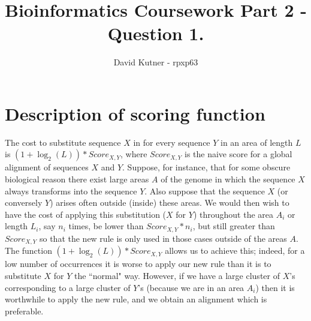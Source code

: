 \documentclass[english, 11pt]{article}
\title{Bioinformatics Coursework Part 2 - Question 1.}
\author{David Kutner - rpxp63}
\begin{document}
\maketitle

\section*{Description of scoring function}
The cost to substitute sequence $X$ in for every sequence $Y$ in an area of length $L$ is $(1+\log_2(L))*Score_{X,Y}$, where $Score_{X,Y}$ is the naive score for a global alignment of sequences $X$ and $Y$.
Suppose, for instance, that for some obscure biological reason there exist large areas $A$ of the genome in which the sequence $X$ always transforms into the sequence $Y$. Also suppose that the sequence $X$ (or conversely $Y$) arises often outside (inside) these areas. We would then wish to have the cost of applying this substitution ($X$ for $Y$) throughout the area $A_i$ or length $L_i$, say $n_i$ times, be lower than $Score_{X,Y}*n_i$, but still greater than $Score_{X,Y}$ so that the new rule is only used in those cases outside of the areas $A$. 
The function $(1+\log_2(L))*Score_{X,Y}$ allows us to achieve this; indeed, for a low number of occurrences it is worse to apply our new rule than it is to substitute $X$ for $Y$ the ``normal" way. However, if we have a large cluster of $X$'s corresponding to a large cluster of $Y$'s (because we are in an area $A_i$) then it is worthwhile to apply the new rule, and we obtain an alignment which is preferable.



\end{document}
